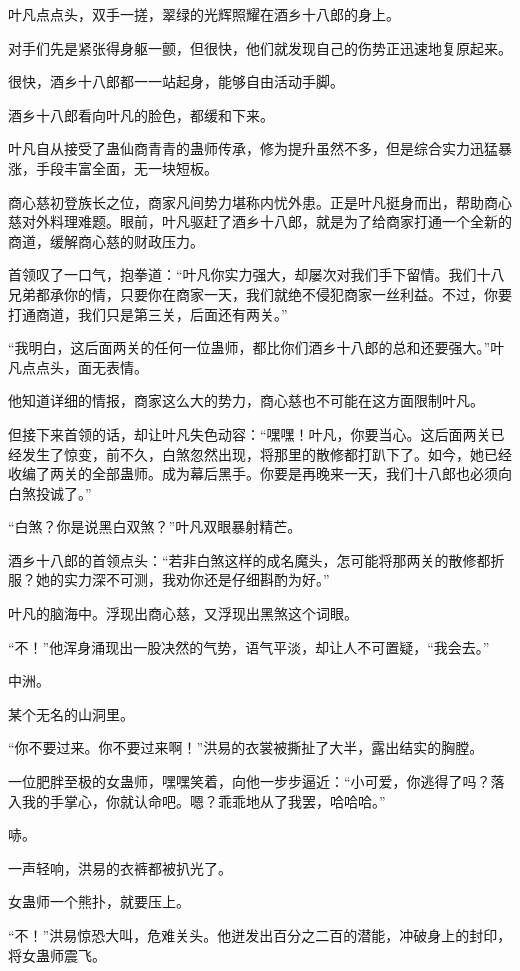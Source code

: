 \begin{this_body}
叶凡点点头，双手一搓，翠绿的光辉照耀在酒乡十八郎的身上。

对手们先是紧张得身躯一颤，但很快，他们就发现自己的伤势正迅速地复原起来。

很快，酒乡十八郎都一一站起身，能够自由活动手脚。

酒乡十八郎看向叶凡的脸色，都缓和下来。

叶凡自从接受了蛊仙商青青的蛊师传承，修为提升虽然不多，但是综合实力迅猛暴涨，手段丰富全面，无一块短板。

商心慈初登族长之位，商家凡间势力堪称内忧外患。正是叶凡挺身而出，帮助商心慈对外料理难题。眼前，叶凡驱赶了酒乡十八郎，就是为了给商家打通一个全新的商道，缓解商心慈的财政压力。

首领叹了一口气，抱拳道：“叶凡你实力强大，却屡次对我们手下留情。我们十八兄弟都承你的情，只要你在商家一天，我们就绝不侵犯商家一丝利益。不过，你要打通商道，我们只是第三关，后面还有两关。”

“我明白，这后面两关的任何一位蛊师，都比你们酒乡十八郎的总和还要强大。”叶凡点点头，面无表情。

他知道详细的情报，商家这么大的势力，商心慈也不可能在这方面限制叶凡。

但接下来首领的话，却让叶凡失色动容：“嘿嘿！叶凡，你要当心。这后面两关已经发生了惊变，前不久，白煞忽然出现，将那里的散修都打趴下了。如今，她已经收编了两关的全部蛊师。成为幕后黑手。你要是再晚来一天，我们十八郎也必须向白煞投诚了。”

“白煞？你是说黑白双煞？”叶凡双眼暴射精芒。

酒乡十八郎的首领点头：“若非白煞这样的成名魔头，怎可能将那两关的散修都折服？她的实力深不可测，我劝你还是仔细斟酌为好。”

叶凡的脑海中。浮现出商心慈，又浮现出黑煞这个词眼。

“不！”他浑身涌现出一股决然的气势，语气平淡，却让人不可置疑，“我会去。”

中洲。

某个无名的山洞里。

“你不要过来。你不要过来啊！”洪易的衣裳被撕扯了大半，露出结实的胸膛。

一位肥胖至极的女蛊师，嘿嘿笑着，向他一步步逼近：“小可爱，你逃得了吗？落入我的手掌心，你就认命吧。嗯？乖乖地从了我罢，哈哈哈。”

哧。

一声轻响，洪易的衣裤都被扒光了。

女蛊师一个熊扑，就要压上。

“不！”洪易惊恐大叫，危难关头。他迸发出百分之二百的潜能，冲破身上的封印，将女蛊师震飞。


\end{this_body}
